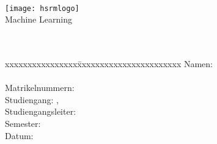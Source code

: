\begin{center}

	\vspace{2.2cm}
	{\large \textbf{\university}}\\
	\vspace{2cm}
	
	\texttt{[image: hsrmlogo]}\\
	\vspace{2.8cm}	
	{\small Machine Learning}\\ 
	\vspace{1cm}
	\doublespacing
	{\Huge \textbf{\reporttitle}}\\ 
	\singlespacing 
	\vspace{1cm}
	{\large \reportsubtitle}\\ 
	\vspace{2.2cm}
	\onehalfspacing
	  
	\begin{tabbing}
		xxxxxxxxxxxxxxxx\=xxxxxxxxxxxxxxxxxxxxxxx\kill
		Namen: \> {\textbf{\studenta}} \\
		\>  \textbf{\studentb}\\
		{Matrikelnummern}: \> \matrikel \\
		Studiengang: \> \studiengang, \degree\\
		Studiengangsleiter: \> \prof \\
		{Semester}: \> \reportsemester  \\
		{Datum:} \> \handoverdate \\
	\end{tabbing}
	\singlespacing 

\end{center}  
